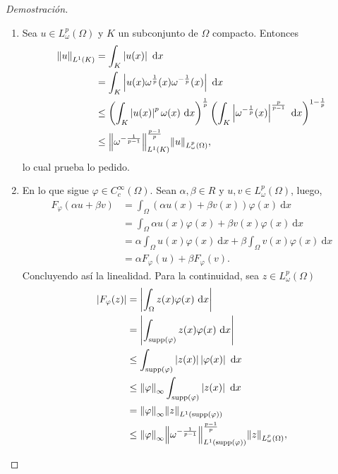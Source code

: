 \documentclass[10pt,a4paper]{report}
\newcommand{\abs}[2][y]{\if#1y\left\fi\lvert#2\if#1y\right\fi\rvert}
\newcommand{\norm}[2][y]{{\if#1y\left\fi\lVert#2\if#1y\right\fi\rVert}}
\theoremstyle{definition}
\renewcommand{\theproblem}{\Alph{problem}}
\numberwithin{equation}{problem}
\providecommand{\abs}[1]{\left\lvert#1\right\rvert}
\providecommand{\norm}[1]{\left\lVert#1\right\rVert}
\begin{document}
\begin{proof}[\textcolor{rojo}{Demostración}]
\begin{enumerate}[label=\textbf{\theproblem.\arabic{*}.},ref=\theproblem.\arabic{*},parsep=1ex]
            \item Sea $u\in L_{\omega}^{p}(\Omega)$ y $K$ un subconjunto de $\Omega$ compacto. Entonces
            \begin{align*}
            	\norm{u}_{L^{1}(K)} &= \int_{K}\abs{u(x)}\ \text{d}x\\ &= \int_{K}\abs{u(x)\omega^{\frac{1}{p}}(x)\omega^{-\frac{1}{p}}(x)}\ \text{d}x\\ 
            	&\leq \left(\int_{K}\abs{u(x)}^{p}\omega(x)\ \text{d}x \right)^{\frac{1}{p}}\left(\int_{K}\abs{\omega^{-\frac{1}{p}}(x)}^{\frac{p}{p-1}}\ \text{d}x\right)^{1-\frac{1}{p}}\\ &\leq \norm{\omega^{-\frac{1}{p-1}}}^{\frac{p-1}{p}}_{L^{1}(K)}\norm{u}_{L^{p}_{\omega}(\Omega)},
            \end{align*}
            lo cual prueba lo pedido.
            \item En lo que sigue $\varphi\in C_{c}^{\infty}(\Omega)$. Sean $\alpha,\beta\in R$ y $u,v\in L^{p}_{\omega}(\Omega)$, luego,
            \begin{align*}
            	F_{\varphi}\left(\alpha u + \beta v\right) &= \int_{\Omega}\left(\alpha u(x) + \beta v(x)\right)\varphi(x)\ \text{d}x\\ &= \int_{\Omega}\alpha u(x)\varphi(x) + \beta v(x)\varphi(x)\ \text{d}x\\ &= \alpha\int_{\Omega}u(x)\varphi(x)\ \text{d}x + \beta\int_{\Omega}v(x)\varphi(x)\ \text{d}x\\ &= \alpha F_{\varphi}(u) + \beta F_{\varphi}(v).
            \end{align*}
            Concluyendo así la linealidad. Para la continuidad, sea $z\in L^{p}_{\omega}(\Omega)$
            \begin{align*}
            	\abs{F_{\varphi}(z)} &= \abs{\int_{\Omega}z(x)\varphi(x)\ \text{d}x}\\ &= \abs{\int_{\text{supp}(\varphi)}z(x)\varphi(x)\ \text{d}x}\\ &\leq \int_{\text{supp}(\varphi)}\abs{z(x)}\abs{\varphi(x)}\ \text{d}x\\
            	&\leq \norm{\varphi}_{\infty} \int_{\text{supp}(\varphi)}\abs{z(x)}\ \text{d}x\\
            	&= \norm{\varphi}_{\infty}\norm{z}_{L^{1}(\text{supp}(\varphi))}\\
            	&\leq \norm{\varphi}_{\infty}\norm{\omega^{-\frac{1}{p-1}}}^{\frac{p-1}{p}}_{L^{1}(\text{supp}(\varphi))}\norm{z}_{L^{p}_{\omega}(\Omega)},
            \end{align*}

\end{enumerate}
\end{proof}
\end{document}
